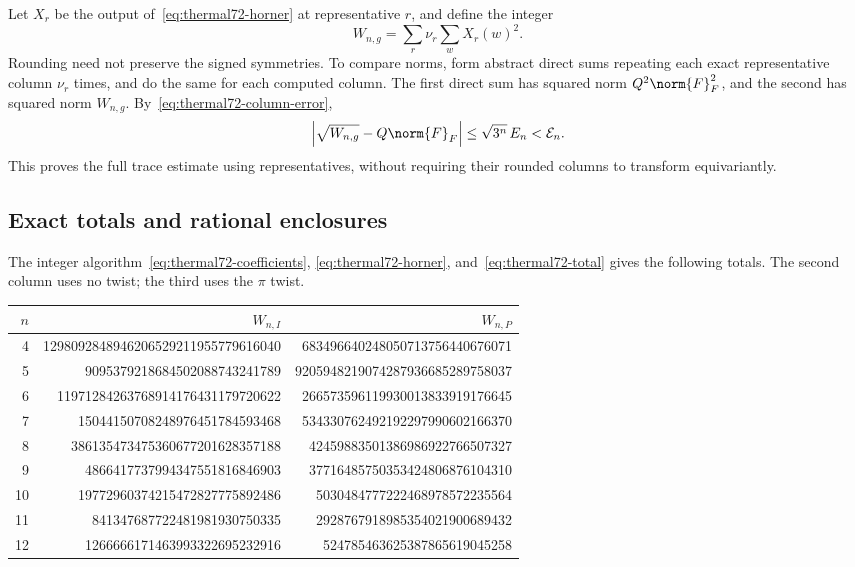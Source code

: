Let \(X_r\) be the output of~\eqref{eq:thermal72-horner} at representative
\(r\), and define the integer
\begin{equation}\label{eq:thermal72-total}
 W_{n,g}=\sum_r\nu_r\sum_w X_r(w)^2.
\end{equation}
Rounding need not preserve the signed symmetries. To compare norms,
form abstract direct sums repeating each exact representative column
\(\nu_r\) times, and do the same for each computed column.
The first direct sum has squared norm \(Q^2\norm{F}_F^2\), and the second
has squared norm \(W_{n,g}\). By~\eqref{eq:thermal72-column-error},
\begin{equation}\label{eq:thermal72-frobenius}
 \left|\sqrt{W_{n,g}}-Q\norm{F}_F\right|
 \le\sqrt{3^n}\,E_n<\mathcal E_n.
\end{equation}
This proves the full trace estimate using representatives, without
requiring their rounded columns to transform equivariantly.

\subsection{Exact totals and rational enclosures}

The integer algorithm~\eqref{eq:thermal72-coefficients},
\eqref{eq:thermal72-horner}, and~\eqref{eq:thermal72-total} gives the
following totals. The second column uses no twist; the third uses the
\(\pi\) twist.
\begin{center}
\begingroup
\footnotesize
\setlength{\tabcolsep}{4pt}
\begin{tabular}{r|rr}
\(n\)&\(W_{n,I}\)&\(W_{n,P}\)\\ \hline
4&1298092848946206529211955779616040&683496640248050713756440676071\\
5&9095379218684502088743241789&9205948219074287936685289758037\\
6&11971284263768914176431179720622&266573596119930013833919176645\\
7&15044150708248976451784593468&534330762492192297990602166370\\
8&386135473475360677201628357188&42459883501386986922766507327\\
9&4866417737994347551816846903&37716485750353424806876104310\\
10&19772960374215472827775892486&5030484777222468978572235564\\
11&841347687722481981930750335&2928767918985354021900689432\\
12&1266666171463993322695232916&524785463625387865619045258
\end{tabular}
\endgroup
\end{center}

